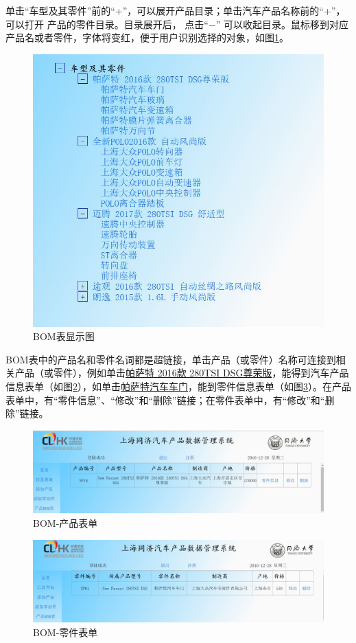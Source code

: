 单击``车型及其零件''前的``+''，可以展开产品目录；单击汽车产品名称前的``+''，可以打开
产品的零件目录。目录展开后， 点击``$-$'' 可以收起目录。鼠标移到对应产品名或者零件，字体将变红，便于用户识别选择的对象，如图\ref{fig:BOM_spread}。
\begin{figure}[H]
\centering
\includegraphics[width=0.9\linewidth]{figure/BOM_spread}
\caption{BOM表显示图}
\label{fig:BOM_spread}
\end{figure}

BOM表中的产品名和零件名词都是超链接，单击产品（或零件）名称可连接到相关产品（或零件），例如单击\underline{帕萨特 2016款 280TSI DSG尊荣版}，能得到汽车产品信息表单（如图\ref{fig:BOM_PROD}），如单击\underline{帕萨特汽车车门}，能到零件信息表单（如图\ref{fig:BOM_PART}）。在产品表单中，有``零件信息''、``修改''和``删除''链接；在零件表单中，有``修改''和``删除''链接。
\begin{figure}[H]
\centering
\includegraphics[width=0.9\linewidth]{figure/BOM_PROD}
\caption{BOM-产品表单}
\label{fig:BOM_PROD}
\end{figure}
\begin{figure}[H]
\centering
\includegraphics[width=0.9\linewidth]{figure/BOM_PART}
\caption{BOM-零件表单}
\label{fig:BOM_PART}
\end{figure}




